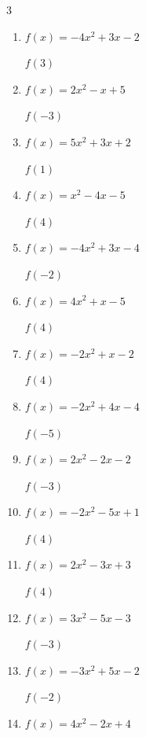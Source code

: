 \begin{multicols}{3}
\begin{enumerate}
$f(-5)$
        \phantom{$= 134$}

  \item $f(x)=-4x^{2}+3x-2$

$f(3)$
        \phantom{$= -29$}

  \item $f(x)=2x^{2}-x+5$

$f(-3)$
        \phantom{$= 26$}

  \item $f(x)=5x^{2}+3x+2$

$f(1)$
        \phantom{$= 10$}

  \item $f(x)=x^{2}-4x-5$

$f(4)$
        \phantom{$= -5$}

  \item $f(x)=-4x^{2}+3x-4$

$f(-2)$
        \phantom{$= -26$}

  \item $f(x)=4x^{2}+x-5$

$f(4)$
        \phantom{$= 63$}

  \item $f(x)=-2x^{2}+x-2$

$f(4)$
        \phantom{$= -30$}

  \item $f(x)=-2x^{2}+4x-4$

$f(-5)$
        \phantom{$= -74$}

  \item $f(x)=2x^{2}-2x-2$

$f(-3)$
        \phantom{$= 22$}

\columnbreak %

  \item $f(x)=-2x^{2}-5x+1$

$f(4)$
        \phantom{$= -51$}

  \item $f(x)=2x^{2}-3x+3$

$f(4)$
        \phantom{$= 23$}

  \item $f(x)=3x^{2}-5x-3$

$f(-3)$
        \phantom{$= 39$}

  \item $f(x)=-3x^{2}+5x-2$

$f(-2)$
        \phantom{$= -24$}

  \item $f(x)=4x^{2}-2x+4$


\end{enumerate}
\end{multicols}

